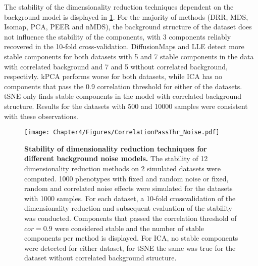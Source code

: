 The stability of the dimensionality reduction techniques dependent on the background model is displayed in \cref{fig:cor-noise}. For the majority of methods (DRR, MDS, Isomap, PCA, PEER and nMDS), the background structure of the dataset does not influence the stability of the components, with \num{3} components reliably recovered in the \num{10}-fold cross-validation. DiffusionMaps and LLE detect more stable components for both datasets with \num{5} and \num{7} stable components in the data with correlated background and \num{7} and \num{5} without correlated background, respectivly. kPCA performs worse for both datasets, while ICA has no components that pass the \num{0.9} correlation threshold for either of the datasets. tSNE only finds stable components in the model with correlated background structure.  Results for the datasets with \num{500} and \num{10000} samples were consistent with these observations.

\begin{figure}[hbtp]
	\centering
	\texttt{[image: Chapter4/Figures/CorrelationPassThr\_Noise.pdf]}
	\caption[\textbf{Stability of dimensionality reduction techniques for different background noise models.}]{\textbf{Stability of dimensionality reduction techniques for different background noise models. }The stability of \num{12} dimensionality reduction methods on \num{2} simulated datasets were computed. \num{1000} phenotypes with fixed and random noise or fixed, random and correlated noise effects were simulated for the datasets with \numlist{1000} samples. For each dataset, a \num{10}-fold crossvalidation of the dimensionality reduction and subsequent evaluation of the stability was conducted. Components that passed the correlation threshold of \(cor=0.9\) were considered stable and the number of stable components per method is displayed. For ICA, no stable components were detected for either dataset, for tSNE the same was true for the dataset without correlated background structure.} 
	 	\label{fig:cor-noise}
\end{figure}

